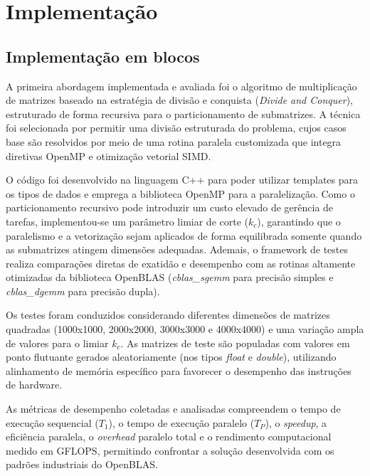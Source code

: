 \documentclass[12pt]{article}
\begin{document}
\section{Implementação}
\subsection{Implementação em blocos}

\par A primeira abordagem implementada e avaliada foi o algoritmo de multiplicação de matrizes baseado na estratégia de divisão e conquista (\textit{Divide and Conquer}), estruturado de forma recursiva para o particionamento de submatrizes. A técnica foi selecionada por permitir uma divisão estruturada do problema, cujos casos base são resolvidos por meio de uma rotina paralela customizada que integra diretivas OpenMP e otimização vetorial SIMD.
\par O código foi desenvolvido na linguagem C++ para poder utilizar templates para os tipos de dados e emprega a biblioteca OpenMP para a paralelização. Como o particionamento recursivo pode introduzir um custo elevado de gerência de tarefas, implementou-se um parâmetro limiar de corte ($k_c$), garantindo que o paralelismo e a vetorização sejam aplicados de forma equilibrada somente quando as submatrizes atingem dimensões adequadas. Ademais, o framework de testes realiza comparações diretas de exatidão e desempenho com as rotinas altamente otimizadas da biblioteca OpenBLAS (\textit{cblas\_sgemm} para precisão simples e \textit{cblas\_dgemm} para precisão dupla).
\par Os testes foram conduzidos considerando diferentes dimensões de matrizes quadradas (1000x1000, 2000x2000, 3000x3000 e 4000x4000) e uma variação ampla de valores para o limiar $k_c$. As matrizes de teste são populadas com valores em ponto flutuante gerados aleatoriamente (nos tipos \textit{float} e \textit{double}), utilizando alinhamento de memória específico para favorecer o desempenho das instruções de hardware.
\par As métricas de desempenho coletadas e analisadas compreendem o tempo de execução sequencial ($T_1$), o tempo de execução paralelo ($T_P$), o \textit{speedup}, a eficiência paralela, o \textit{overhead} paralelo total e o rendimento computacional medido em GFLOPS, permitindo confrontar a solução desenvolvida com os padrões industriais do OpenBLAS.
\end{document}
